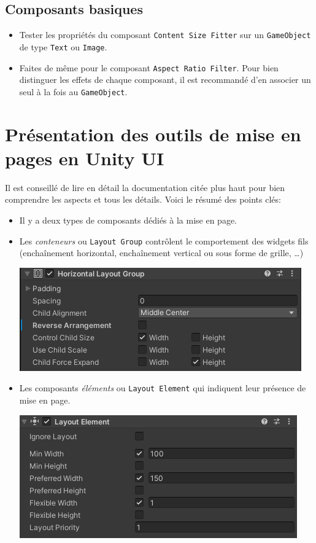 \documentclass[a4paper,10pt]{article}
\begin{document}
\subsection*{Composants basiques}

\begin{itemize}
	  \item Tester les propriétés du  composant \texttt{Content Size Fitter} sur un \texttt{GameObject} de type \texttt{Text} ou \texttt{Image}.
	  
	  \item Faites de même pour le composant \texttt{Aspect Ratio Filter}. Pour bien distinguer les effets de chaque composant, il est recommandé d'en associer un seul à la fois au \texttt{GameObject}.
\end{itemize}

\section{Présentation des outils de mise en pages en Unity UI}

Il est conseillé de lire en détail la documentation citée plus haut pour bien comprendre les aspects et tous les détails. Voici le résumé des points clés:
\begin{itemize}
	\item Il y a deux types de composants dédiés à la mise en page.
	\item Les \textit{conteneurs} ou \texttt{Layout Group} contrôlent le comportement des widgets fils (enchaînement horizontal, enchaînement vertical ou sous forme de grille, \ldots)
\begin{center}
	\includegraphics[width=0.6\linewidth]{rc/ui_layout_group_horiz}
\end{center}	
	\item Les composants \textit{éléments} ou \texttt{Layout Element} qui indiquent leur présence de mise en page.
\begin{center}
	\includegraphics[width=0.6\linewidth]{rc/ui_layout_element}
\end{center}
\end{itemize}
\end{document}

